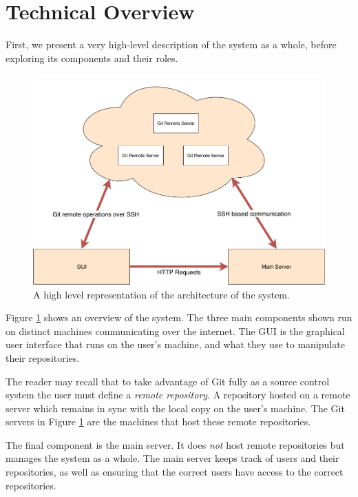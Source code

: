 \section{Technical Overview}

First, we present a very high-level description of the system as a whole, before exploring its components and their roles.

\begin{figure} 
    \centering
    \includegraphics[scale = 0.5]{figures/highlevel.pdf}
    \caption{A high level representation of the architecture of the system. }
    \label{fig:highlevel}
\end{figure}

Figure \ref{fig:highlevel} shows an overview of the system. The three main components shown run on distinct machines communicating over the internet. The GUI is the graphical user interface that runs on the user's machine, and what they use to manipulate their repositories. 

The reader may recall that to take advantage of Git fully as a source control system the user must define a \emph{remote repository}. A repository hosted on a remote server which remains in sync with the local copy on the user's machine. The Git servers in Figure \ref{fig:highlevel} are the machines that host these remote repositories.

The final component is the main server. It does \emph{not} host remote repositories but manages the system as a whole. The main server keeps track of users and their repositories, as well as ensuring that the correct users have access to the correct repositories. 

